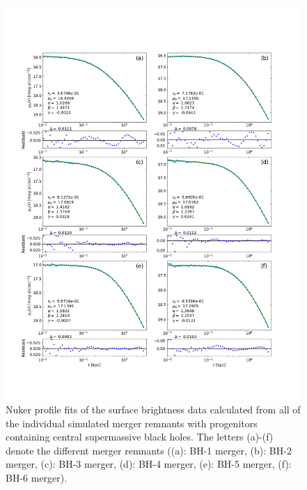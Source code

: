 \documentclass[english, oneside]{HYgradu}
\begin{document}
\begin{figure}[h]
	\centering
	\includegraphics[width=\textwidth]{all_nuker_profiles.png}
	\caption{Nuker profile fits of the surface brightness data calculated from all of the individual simulated merger remnants with progenitors containing central supermassive black holes. The letters (a)-(f) denote the different merger remnants ((a): BH-1 merger, (b): BH-2 merger, (c): BH-3 merger, (d): BH-4 merger, (e): BH-5 merger, (f): BH-6 merger).}
	\label{figure:all_nuker}
\end{figure}
\end{document}
